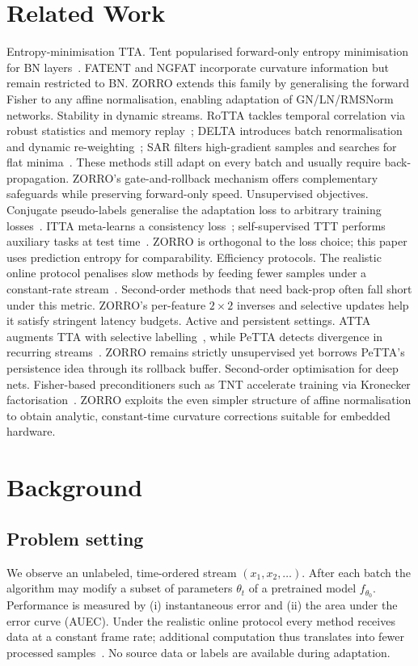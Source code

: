 \documentclass{article} %
\begin{document}
\section{Related Work}
\label{sec:related}%
Entropy-minimisation TTA\@. Tent popularised forward-only entropy minimisation for BN layers~\cite{wang-2020-tent}. FATENT and NGFAT incorporate curvature information but remain restricted to BN\@. ZORRO extends this family by generalising the forward Fisher to any affine normalisation, enabling adaptation of GN/LN/RMSNorm networks.
Stability in dynamic streams. RoTTA tackles temporal correlation via robust statistics and memory replay~\cite{yuan-2023-robust}; DELTA introduces batch renormalisation and dynamic re-weighting~\cite{zhao-2023-delta}; SAR filters high-gradient samples and searches for flat minima~\cite{niu-2023-towards}. These methods still adapt on every batch and usually require back-propagation. ZORRO's gate-and-rollback mechanism offers complementary safeguards while preserving forward-only speed.
Unsupervised objectives. Conjugate pseudo-labels generalise the adaptation loss to arbitrary training losses~\cite{goyal-2022-test}. ITTA meta-learns a consistency loss~\cite{chen-2023-improved}; self-supervised TTT performs auxiliary tasks at test time~\cite{sun-2019-test}. ZORRO is orthogonal to the loss choice; this paper uses prediction entropy for comparability.
Efficiency protocols. The realistic online protocol penalises slow methods by feeding fewer samples under a constant-rate stream~\cite{alfarra-2023-evaluation}. Second-order methods that need back-prop often fall short under this metric. ZORRO's per-feature \(2\times2\) inverses and selective updates help it satisfy stringent latency budgets.
Active and persistent settings. ATTA augments TTA with selective labelling~\cite{gui-2024-active}, while PeTTA detects divergence in recurring streams~\cite{hoang-2023-persistent}. ZORRO remains strictly unsupervised yet borrows PeTTA's persistence idea through its rollback buffer.
Second-order optimisation for deep nets. Fisher-based preconditioners such as TNT accelerate training via Kronecker factorisation~\cite{ren-2021-tensor}. ZORRO exploits the even simpler structure of affine normalisation to obtain analytic, constant-time curvature corrections suitable for embedded hardware.

\section{Background}
\label{sec:background}%
\subsection{Problem setting}
We observe an unlabeled, time-ordered stream \((x_1, x_2,\dots)\). After each batch the algorithm may modify a subset of parameters \(\theta_t\) of a pretrained model \(f_{\theta_0}\). Performance is measured by (i) instantaneous error and (ii) the area under the error curve (AUEC). Under the realistic online protocol every method receives data at a constant frame rate; additional computation thus translates into fewer processed samples~\cite{alfarra-2023-evaluation}. No source data or labels are available during adaptation.
\end{document}
